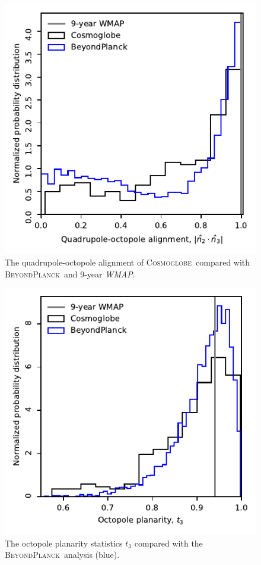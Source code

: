 \documentclass[twocolumn]{../../common/aa}
\def\WMAP{\emph{WMAP}}
\newcommand{\BP}{\textsc{BeyondPlanck}}
\newcommand{\Cosmoglobe}{\textsc{Cosmoglobe}}
\begin{document}
\begin{figure}[t]
	\includegraphics[width=\columnwidth]{figures/WMAP_n_2_n_3.pdf}
	\caption{The quadrupole-octopole alignment of \Cosmoglobe\ compared with \BP\ and 9-year \WMAP.}
        \label{fig:alignment}
\end{figure}

\begin{figure}[t]
	\includegraphics[width=\columnwidth]{figures/WMAP_t_3.pdf}
	\caption{The octopole planarity statistics $t_3$ compared with the \BP\ analysis (blue).}
        \label{fig:planarity}        
\end{figure}
\end{document}
